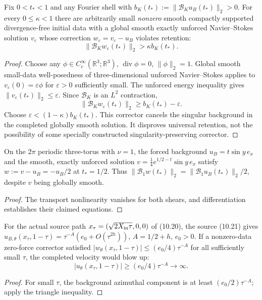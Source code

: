 \begin{theorem}
\label{thm:xxxii-noret}
Fix $0<t_*<1$ and any Fourier shell with
$b_K(t_*):=\|\mathcal B_Ku_B(t_*)\|_2>0$.
For every $0\le\kappa<1$ there are arbitrarily small
\emph{nonzero} smooth compactly supported divergence-free
initial data with a global smooth exactly unforced
Navier--Stokes solution $v_\varepsilon$ whose correction
$w_\varepsilon=v_\varepsilon-u_B$ violates retention:
\[
\boxed{\quad
\|\mathcal B_Kw_\varepsilon(t_*)\|_2>
\kappa b_K(t_*).\quad}
\]
\end{theorem}
\begin{proof}
Choose any $\phi\in C_c^\infty(\mathbb R^3;\mathbb R^3)$,
$\operatorname{div}\phi=0$, $\|\phi\|_2=1$.
Global smooth small-data well-posedness of three-dimensional
unforced Navier--Stokes applies to
$v_\varepsilon(0)=\varepsilon\phi$ for $\varepsilon>0$
sufficiently small. The unforced energy inequality gives
$\|v_\varepsilon(t_*)\|_2\le\varepsilon$.
Since $\mathcal B_K$ is an $L^2$ contraction,
\[
\|\mathcal B_Kw_\varepsilon(t_*)\|_2
\ge b_K(t_*)-\varepsilon.
\]
Choose $\varepsilon<(1-\kappa)b_K(t_*)$.
This corrector cancels the singular background in the
completed globally smooth solution. It disproves
universal retention, not the possibility of some specially
constructed singularity-preserving corrector.
\end{proof}

\begin{proposition}
On the $2\pi$ periodic three-torus with $\nu=1$, the forced
background $u_B=t\sin y\,e_x$ and the smooth, exactly unforced
solution $v=\tfrac14e^{1/2-t}\sin y\,e_x$ satisfy
$w:=v-u_B=-u_B/2$ at $t_*=1/2$.
Thus $\|\mathcal B_1 w(t_*)\|_2=
\|\mathcal B_1u_B(t_*)\|_2/2$, despite $v$ being
globally smooth.
\end{proposition}
\begin{proof}
The transport nonlinearity vanishes for both shears,
and differentiation establishes their claimed equations.
\end{proof}

\begin{proposition}
For the actual source path
$x_\tau=(\sqrt{2X_{\rm in}\tau},0,0)$ of (10.20),
the source (10.21) gives
$u_{B,\theta}(x_\tau,1-\tau)=
\tau^{-A}(e_0+O(\tau^{2h}))$,
$A=1/2+h$, $e_0>0$.
If a nonzero-data zero-force corrector satisfied
$|w_\theta(x_\tau,1-\tau)|\le
(e_0/4)\tau^{-A}$ for all sufficiently small $\tau$,
the completed velocity would blow up:
\[
|u_\theta(x_\tau,1-\tau)|
\ge(e_0/4)\tau^{-A}\longrightarrow\infty.
\]
\end{proposition}
\begin{proof}
For small $\tau$, the background azimuthal component is at
least $(e_0/2)\tau^{-A}$; apply the triangle inequality.
\end{proof}

